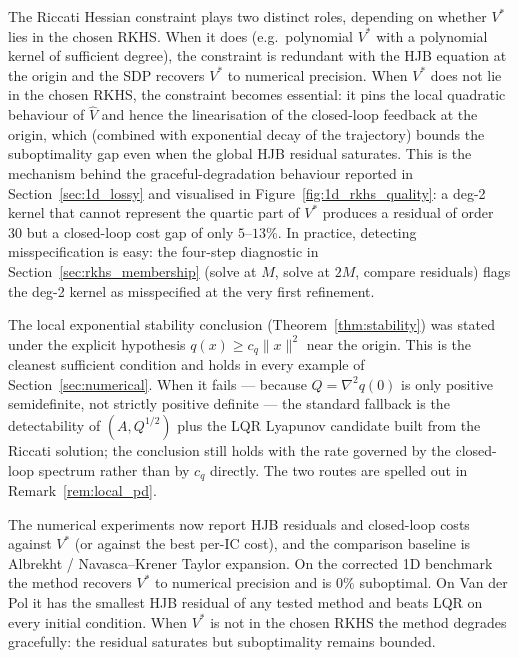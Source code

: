 \documentclass[11pt]{article}
\begin{document}
The Riccati Hessian constraint plays two distinct roles, depending on whether $V^*$ lies in the chosen RKHS. When it does (e.g.\ polynomial $V^*$ with a polynomial kernel of sufficient degree), the constraint is redundant with the HJB equation at the origin and the SDP recovers $V^*$ to numerical precision. When $V^*$ does not lie in the chosen RKHS, the constraint becomes essential: it pins the local quadratic behaviour of $\hat V$ and hence the linearisation of the closed-loop feedback at the origin, which (combined with exponential decay of the trajectory) bounds the suboptimality gap even when the global HJB residual saturates. This is the mechanism behind the graceful-degradation behaviour reported in Section~\ref{sec:1d_lossy} and visualised in Figure~\ref{fig:1d_rkhs_quality}: a deg-2 kernel that cannot represent the quartic part of $V^*$ produces a residual of order $30$ but a closed-loop cost gap of only $5$--$13\%$. In practice, detecting misspecification is easy: the four-step diagnostic in Section~\ref{sec:rkhs_membership} (solve at $M$, solve at $2M$, compare residuals) flags the deg-2 kernel as misspecified at the very first refinement.

The local exponential stability conclusion (Theorem~\ref{thm:stability}) was stated under the explicit hypothesis $q(x)\geq c_q\|x\|^2$ near the origin. This is the cleanest sufficient condition and holds in every example of Section~\ref{sec:numerical}. When it fails --- because $Q = \nabla^2 q(0)$ is only positive semidefinite, not strictly positive definite --- the standard fallback is the detectability of $(A,Q^{1/2})$ plus the LQR Lyapunov candidate built from the Riccati solution; the conclusion still holds with the rate governed by the closed-loop spectrum rather than by $c_q$ directly. The two routes are spelled out in Remark~\ref{rem:local_pd}.

The numerical experiments now report HJB residuals and closed-loop costs against $V^*$ (or against the best per-IC cost), and the comparison baseline is Albrekht / Navasca--Krener Taylor expansion. On the corrected 1D benchmark the method recovers $V^*$ to numerical precision and is $0\%$ suboptimal. On Van der Pol it has the smallest HJB residual of any tested method and beats LQR on every initial condition. When $V^*$ is not in the chosen RKHS the method degrades gracefully: the residual saturates but suboptimality remains bounded.
\end{document}
